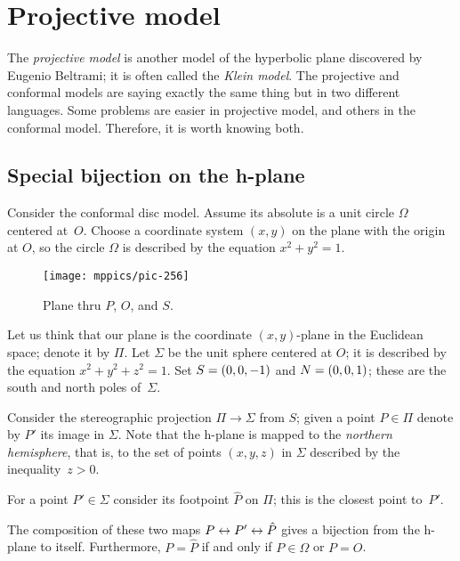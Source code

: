 \chapter{Projective model}\label{chap:klein}

The \textit{projective model} is another model of the hyperbolic plane discovered by Eugenio Beltrami; it is often called the {}\emph{Klein model}.
The projective and conformal models are saying exactly the same thing but in two different languages.
Some problems  are easier in projective model, and others in the conformal model.
Therefore, it is worth knowing both. 

\section{Special bijection on the h-plane}
\label{sec:special-bijection}

Consider the conformal disc model.
Assume its absolute is a unit circle $\Omega$ centered at~$O$.
Choose a coordinate system $(x,y)$ on the plane with the origin at $O$, 
so the circle $\Omega$ is described by the equation $x^2+y^2=1$.


\label{pic:stereographic_projection-klein}
\begin{wrapfigure}{o}{48mm}
\centering
\vskip-3mm
\texttt{[image: mppics/pic-256]}
\caption*{Plane thru $P$, $O$, and $S$.}
\vskip-3mm
\end{wrapfigure}

Let us think that our plane is the coordinate $(x,y)$-plane in the Euclidean space; denote it by $\Pi$.
Let $\Sigma$ be the unit sphere centered at $O$;
it is described by the equation 
$x^2+y^2+z^2=1$.
Set $S=(0,0,-1)$ and $N=(0,0,1)$; 
these are the south and north poles of~$\Sigma$.

Consider the stereographic projection $\Pi\to\Sigma$ from $S$;
given a point $P\in\Pi$ denote by $P'$ its image in $\Sigma$.
Note that the  h-plane is mapped to the {}\emph{northern hemisphere},
that is, to the set of points $(x,y,z)$ in $\Sigma$ described by the inequality~$z>0$.

For a point $P'\in \Sigma$ consider its footpoint $\hat P$
on $\Pi$;
this is the closest point to~$P'$.

The composition of these two maps $P\leftrightarrow P'\leftrightarrow\hat P$
gives a bijection from the h-plane to itself.
Furthermore, $P=\hat P$
 if and only if  $P\in \Omega$ or $P=O$.


